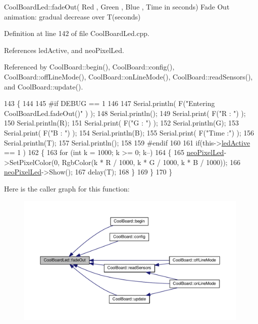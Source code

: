 Cool\+Board\+Led\+::fade\+Out( Red , Green , Blue , Time in seconds) Fade Out animation\+: gradual decrease over T(seconds) 

Definition at line 142 of file Cool\+Board\+Led.\+cpp.



References led\+Active, and neo\+Pixel\+Led.



Referenced by Cool\+Board\+::begin(), Cool\+Board\+::config(), Cool\+Board\+::off\+Line\+Mode(), Cool\+Board\+::on\+Line\+Mode(), Cool\+Board\+::read\+Sensors(), and Cool\+Board\+::update().


\begin{DoxyCode}
143 \{
144 
145 \textcolor{preprocessor}{#if DEBUG == 1 }
146 
147     Serial.println( F(\textcolor{stringliteral}{"Entering CoolBoardLed.fadeOut()"} ) );
148     Serial.println();
149     Serial.print( F(\textcolor{stringliteral}{"R : "}) );
150     Serial.println(R);
151     Serial.print( F(\textcolor{stringliteral}{"G : "}) );
152     Serial.println(G);
153     Serial.print( F(\textcolor{stringliteral}{"B : "}) );
154     Serial.println(B);
155     Serial.print( F(\textcolor{stringliteral}{"Time :"}) );
156     Serial.println(T);
157     Serial.println();
158 
159 \textcolor{preprocessor}{#endif  }
160 
161     \textcolor{keywordflow}{if}(this->\hyperlink{classCoolBoardLed_a5f17c135516fcf4b44ea8a096ba0177a}{ledActive} == 1 )
162     \{
163         \textcolor{keywordflow}{for} (\textcolor{keywordtype}{int} k = 1000; k >= 0; k--) 
164         \{
165             \hyperlink{classCoolBoardLed_ac2c13fa462a010cd9242bf297c013923}{neoPixelLed}->SetPixelColor(0, RgbColor(k * R / 1000, k * G / 1000, k * B / 1000));
166             \hyperlink{classCoolBoardLed_ac2c13fa462a010cd9242bf297c013923}{neoPixelLed}->Show();
167             delay(T);
168         \}
169     \}
170 \}
\end{DoxyCode}
Here is the caller graph for this function\+:
\nopagebreak
\begin{figure}[H]
\begin{center}
\leavevmode
\includegraphics[width=350pt]{classCoolBoardLed_a93d545679237e8cc858324367149775c_icgraph}
\end{center}
\end{figure}
\mbox{\label{classCoolBoardLed_a8ed3053a36f0ed4a131f43b5b17efb61}} 
